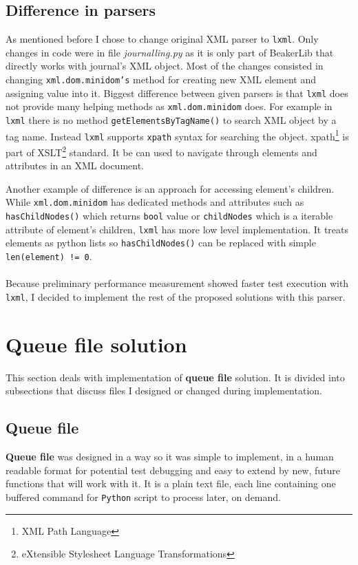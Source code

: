 \subsection{Difference in parsers}
As mentioned before I chose to change original XML parser to \texttt{lxml}. Only changes in code were in file \textit{journalling.py} as it is only part of BeakerLib that directly works with journal's XML object. 
Most of the changes consisted in changing \texttt{xml.dom.minidom's} method for creating new XML element and assigning value into it.
Biggest difference between given parsers is that \texttt{lxml} does not provide many helping methods as \texttt{xml.dom.minidom} does.
For example in \texttt{lxml}  there is no method \texttt{getElementsByTagName()} to search XML object by a tag name. Instead \texttt{lxml} supports \texttt{xpath} \cite{xpath} syntax for searching the object. xpath\footnote{XML Path Language} is part of XSLT\footnote{eXtensible Stylesheet Language Transformations} standard. It be can used to navigate through elements and attributes in an XML document.

Another example of difference is an approach for accessing element's children. While \texttt{xml.dom.minidom} has dedicated methods and attributes such as \texttt{hasChildNodes()} which returns \texttt{bool} value or \texttt{childNodes} which is a iterable attribute of element's children, \texttt{lxml} has more low level implementation. It treats elements as python lists so \texttt{hasChildNodes()} can be replaced with simple \texttt{len(element) != 0}.
\\
\\
Because preliminary performance measurement showed faster test execution with \texttt{lxml}, I decided to implement the rest of the proposed solutions with this parser.

\section{Queue file solution}
This section deals with implementation of \textbf{queue file} solution. It is divided into subsections that discuss files I designed or changed during implementation. 

\subsection{Queue file}
\textbf{Queue file} was designed in a way so it was simple to implement, in a human readable format for potential test debugging and easy to extend by new, future functions that will work with it. 
It is a plain text file, each line containing one buffered command for \texttt{Python} script to process later, on demand. 

